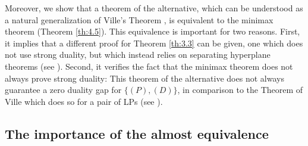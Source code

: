 \documentclass[11pt, twoside]{article}
\numberwithin{equation}{section}
\theoremstyle{definition}
\begin{document}
Moreover, we show that a theorem of the alternative, which can be understood as a natural generalization of Ville's Theorem \cite{ville1938theorie}, is equivalent to the minimax theorem (Theorem \ref{th:4.5}). This equivalence is important for two reasons. First, it implies that a different proof for Theorem \ref{th:3.3} can be given, one which does not use strong duality, but which instead relies on separating hyperplane theorems (see \cite{doi:10.1080/02331938908843428, yang2000theorems}). Second, it verifies the fact that the minimax theorem does not always prove strong duality: This theorem of the alternative does not always guarantee a zero duality gap for \hyperlink{primaldual}{$\{(P),(D)\}$}, in comparison to the Theorem of Ville which does so for a pair of LPs (see \cite{adler2013equivalence, von2024zero}).


\vspace{-0.1cm}\subsection{The importance of the almost equivalence}\vspace{-0.2cm}
\end{document}
